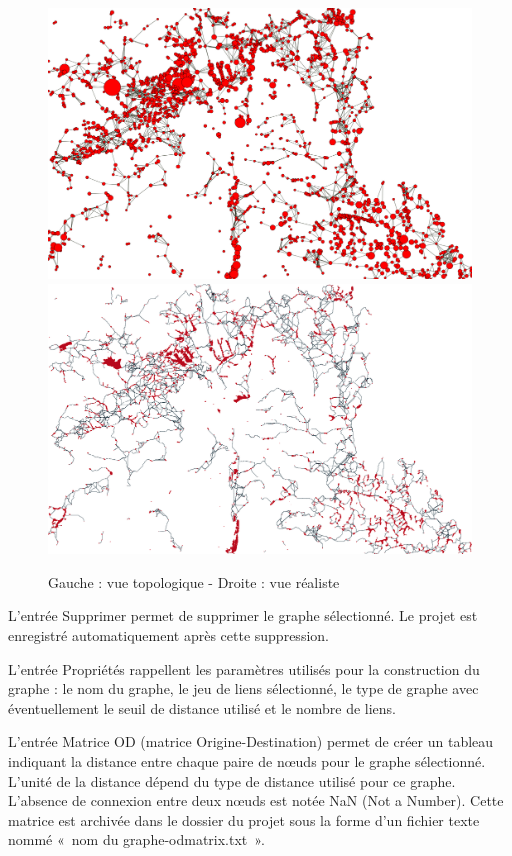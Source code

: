 \documentclass{article}
\begin{document}
\begin{figure}[H]
	\includegraphics[scale=0.1]{img/manual-fr_img17.png} 
	\includegraphics[scale=0.1]{img/manual-fr_img18.png} 
	\caption*{Gauche : vue topologique - Droite : vue réaliste}
\end{figure}


L'entrée Supprimer permet de supprimer le graphe sélectionné. Le projet est enregistré automatiquement après cette suppression.

L'entrée Propriétés rappellent les paramètres utilisés pour la construction du graphe : le nom du graphe, le jeu de liens sélectionné, le type de graphe avec éventuellement le seuil de distance utilisé et le nombre de liens.

L'entrée Matrice OD (matrice Origine-Destination) permet de créer un tableau indiquant la distance entre chaque paire de nœuds pour le graphe sélectionné. L’unité de la distance dépend du type de distance utilisé pour ce graphe. L’absence de connexion entre deux nœuds est notée NaN (Not a Number). Cette  matrice est archivée dans le dossier du projet sous la forme d’un fichier texte nommé «~nom du graphe-odmatrix.txt~». 
\end{document}
